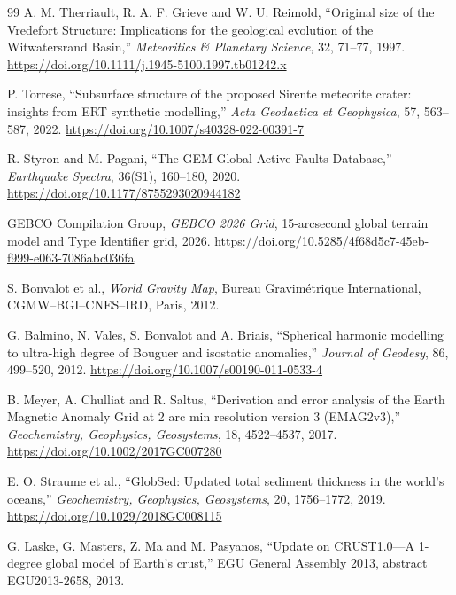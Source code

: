 \documentclass[11pt]{article}
\begin{document}
\begin{thebibliography}{99}
A. M. Therriault, R. A. F. Grieve and W. U. Reimold, ``Original size of the Vredefort Structure: Implications for the geological evolution of the Witwatersrand Basin,'' \emph{Meteoritics \& Planetary Science}, 32, 71--77, 1997. \url{https://doi.org/10.1111/j.1945-5100.1997.tb01242.x}

P. Torrese, ``Subsurface structure of the proposed Sirente meteorite crater: insights from ERT synthetic modelling,'' \emph{Acta Geodaetica et Geophysica}, 57, 563--587, 2022. \url{https://doi.org/10.1007/s40328-022-00391-7}

R. Styron and M. Pagani, ``The GEM Global Active Faults Database,'' \emph{Earthquake Spectra}, 36(S1), 160--180, 2020. \url{https://doi.org/10.1177/8755293020944182}

GEBCO Compilation Group, \emph{GEBCO 2026 Grid}, 15-arcsecond global terrain model and Type Identifier grid, 2026. \url{https://doi.org/10.5285/4f68d5c7-45eb-f999-e063-7086abc036fa}

S. Bonvalot et al., \emph{World Gravity Map}, Bureau Gravim\'etrique International, CGMW--BGI--CNES--IRD, Paris, 2012.

G. Balmino, N. Vales, S. Bonvalot and A. Briais, ``Spherical harmonic modelling to ultra-high degree of Bouguer and isostatic anomalies,'' \emph{Journal of Geodesy}, 86, 499--520, 2012. \url{https://doi.org/10.1007/s00190-011-0533-4}

B. Meyer, A. Chulliat and R. Saltus, ``Derivation and error analysis of the Earth Magnetic Anomaly Grid at 2 arc min resolution version 3 (EMAG2v3),'' \emph{Geochemistry, Geophysics, Geosystems}, 18, 4522--4537, 2017. \url{https://doi.org/10.1002/2017GC007280}

E. O. Straume et al., ``GlobSed: Updated total sediment thickness in the world's oceans,'' \emph{Geochemistry, Geophysics, Geosystems}, 20, 1756--1772, 2019. \url{https://doi.org/10.1029/2018GC008115}

G. Laske, G. Masters, Z. Ma and M. Pasyanos, ``Update on CRUST1.0---A 1-degree global model of Earth's crust,'' EGU General Assembly 2013, abstract EGU2013-2658, 2013.

\end{thebibliography}
\end{document}
